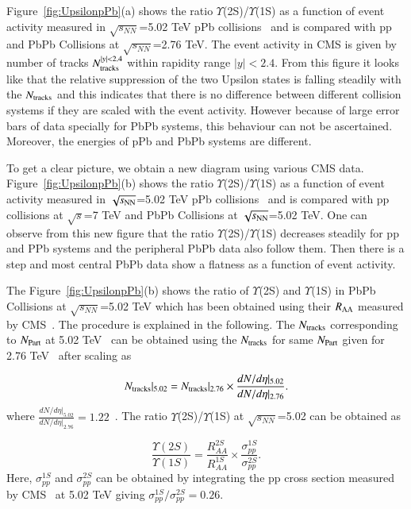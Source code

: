 Figure~\ref{fig:UpsilonpPb}(a) shows
the ratio $\Upsilon$(2S)/$\Upsilon$(1S) as a function of event activity measured in 
$\sqrt{s_{NN}}$=5.02 TeV pPb collisions~\cite{CMS:2013jsu} and is compared with pp
and PbPb Collisions at $\sqrt{s_{NN}}$=2.76 TeV.
The event activity in CMS is given by number of tracks $N_{\rm tracks}^{|y|<2.4}$ within rapidity
range $|y|<2.4$. From this figure it looks like that the relative suppression of
the two Upsilon states is falling steadily with the $N_{\rm tracks}$  and
this indicates that there is no difference between different collision systems if
they are scaled with the event activity. However because of large error bars
of data specially for PbPb systems, this behaviour can not be ascertained.
Moreover, the energies of pPb and PbPb systems are different.

To get a clear picture, we obtain a new diagram using various CMS data.
Figure~\ref{fig:UpsilonpPb}(b) shows the ratio $\Upsilon$(2S)/$\Upsilon$(1S) as a function of
event activity measured in $\sqrt{s_{\rm NN}}$=5.02 TeV pPb collisions~\cite{CMS:2013jsu}
and is compared with pp collisions at $\sqrt{s}$=7 TeV \cite{CMS:2020fae} and
PbPb Collisions at $\sqrt{s_{\rm NN}}$=5.02 TeV. One can observe from this new figure
that the ratio $\Upsilon$(2S)/$\Upsilon$(1S) decreases steadily for pp and PPb systems
and the peripheral PbPb data also follow them. Then there is a step and most central PbPb
data show a flatness as a function of event activity. 

The  Figure~\ref{fig:UpsilonpPb}(b) shows the ratio of $\Upsilon$(2S)
and $\Upsilon$(1S) in PbPb Collisions at
$\sqrt{s_{NN}}$=5.02 TeV which has been obtained using their $R_{\rm AA}$ measured by
CMS~\cite{CMS:2022wfi}. The procedure is explained in the following.
The $N_{\rm tracks}$ corresponding to $N_{\rm Part}$ at 5.02 TeV~\cite{CMS:2018zza}
can be obtained using the $N_{\rm tracks}$ for same $N_{\rm Part}$ given
for 2.76 TeV~\cite{CMS:2013jsu} after scaling as

\begin{equation}
N_{\rm tracks}|_{5.02} =  N_{\rm tracks}|_{2.76} \times \frac{dN/d\eta |_{5.02}} {dN/d\eta|_{2.76}}.
\end{equation}
where $\frac{dN/d\eta |_{5.02}} {dN/d\eta|_{2.76}}=1.22$~\cite{CMS:2018zza,CMS:2013jsu}.
The ratio $\Upsilon$(2S)/$\Upsilon$(1S) at $\sqrt{s_{NN}}$=5.02 can be obtained as 

\begin{equation}
\frac{\Upsilon(2S)}{\Upsilon(1S)} = \frac{R_{AA}^{2S}}{R_{AA}^{1S}} \times \frac{\sigma_{pp}^{1S}}{\sigma_{pp}^{2S}}.
\end{equation}
Here, $\sigma_{pp}^{1S}$ and $\sigma_{pp}^{2S}$ can be obtained by integrating the pp cross section
measured by CMS~\cite{CMS:2013jsu} at 5.02 TeV giving $\sigma_{pp}^{1S}/\sigma_{pp}^{2S}=0.26$.





